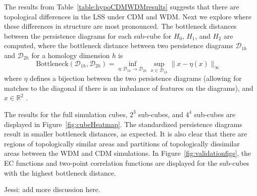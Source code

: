 \documentclass[12pt]{article}
\newcommand{\figref}[1]{Figure~\ref{#1}}
\begin{document}
The results from Table~\ref{table:hypoCDMWDMresults} suggests that there are topological differences in the LSS under CDM and WDM.  Next we explore where these differences in structure are most pronounced.  The bottleneck distances between the persistence diagrams for each sub-cube for $H_0$, $H_1$, and $H_2$ are computed, where the bottleneck distance between two persistence diagrams $\mathcal D_{1h}$ and $\mathcal D_{2h}$ for a homology dimension $h$ is
%
\begin{equation*}
\text{Bottleneck}(\mathcal D_{1h}, \mathcal D_{2h}) = \inf_{\eta: \mathcal D_{1h} \rightarrow \mathcal D_{2h}} \sup_{x \in \mathcal D_{1h}} \|x - \eta(x)  \|_{\infty}
\end{equation*}
%
where $\eta$ defines a bijection between the two persistence diagrams (allowing for matches to the diagonal if there is an imbalance of features on the diagrams), and $x \in \mathbb R^2$ \citep{edelsbrunner2010computational}.


The results for the full simulation cubes, $2^3$ sub-cubes, and $4^4$ sub-cubes are displayed in \figref{fig:cubeHeatmap}.  The standardized persistence diagrams result in smaller bottleneck distances, as expected.  
%
It is also clear that there are regions of topologically similar areas and partitions of topologically dissimilar areas between the WDM and CDM simulations.
In \figref{fig:validationfigs}, the EC functions and two-point correlation functions are displayed for the sub-cubes with the highest bottleneck distance.


{\color{blue}  Jessi:  add more discussion here.}
\end{document}
